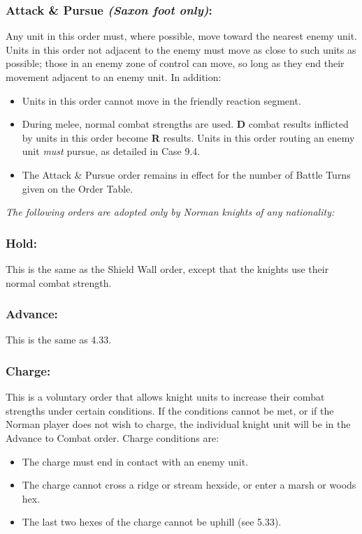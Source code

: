 \subsubsection{Attack \& Pursue \textit{(Saxon foot only)}:} Any unit in this order must, where possible, move toward the nearest enemy unit. Units in this order not adjacent to the enemy must move as close to such units as possible; those in an enemy zone of control can move, so long as they end their movement adjacent to an enemy unit. In addition:

\begin{itemize}
  \item Units in this order cannot move in the friendly reaction segment.
  \item During melee, normal combat strengths are used. \textbf{D} combat results inflicted by units in this order become \textbf{R} results. Units in this order routing an enemy unit \textit{must} pursue, as detailed in Case 9.4.
  \item The Attack \& Pursue order remains in effect for the number of Battle Turns given on the Order Table.
\end{itemize}

\textit{The following orders are adopted only by Norman knights of any nationality:}

\subsubsection{Hold:} This is the same as the Shield Wall order, except that the knights use their normal combat strength.

\subsubsection{Advance:} This is the same as 4.33.

\subsubsection{Charge:} This is a voluntary order that allows knight units to increase their combat strengths under certain conditions. If the conditions cannot be met, or if the Norman player does not wish to charge, the individual knight unit will be in the Advance to Combat order. Charge conditions are:

\begin{itemize}
  \item The charge must end in contact with an enemy unit.
  \item The charge cannot cross a ridge or stream hexside, or enter a marsh or woods hex.
  \item The last two hexes of the charge cannot be uphill (see 5.33).
\end{itemize}


